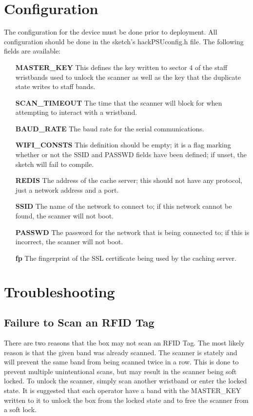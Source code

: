 \documentclass{article}
\begin{document}
\section{Configuration}
The configuration for the device must be done prior to deployment.  All configuration should be done in the sketch's hackPSUconfig.h file.  The following fields are available:
\begin{itemize}
	\item[\textbf{MASTER\_KEY}] This defines the key written to sector 4 of the staff wristbands used to unlock the scanner as well as the key that the duplicate state writes to staff bands.
	\item[\textbf{SCAN\_TIMEOUT}] The time that the scanner will block for when attempting to interact with a wristband.  
	\item[\textbf{BAUD\_RATE}] The baud rate for the serial communications.  
	\item[\textbf{WIFI\_CONSTS}] This definition should be empty; it is a flag marking whether or not the SSID and PASSWD fields have been defined; if unset, the sketch will fail to compile. 
	\item[\textbf{REDIS}] The address of the cache server; this should not have any protocol, just a network address and a port.
	\item[\textbf{SSID}] The name of the network to connect to; if this network cannot be found, the scanner will not boot.
	\item[\textbf{PASSWD}] The password for the network that is being connected to; if this is incorrect, the scanner will not boot.
	\item[\textbf{fp}] The fingerprint of the SSL certificate being used by the caching server.
\end{itemize}

\section{Troubleshooting}

\subsection{Failure to Scan an RFID Tag}
There are two reasons that the box may not scan an RFID Tag.  The most likely reason is that the given band was already scanned.  The scanner is stately and will prevent the same band from being scanned twice in a row.  This is done to prevent multiple unintentional scans, but may result in the scanner being soft locked.  To unlock the scanner, simply scan another wristband or enter the locked state.  It is suggested that each operator have a band with the MASTER\_KEY written to it to unlock the box from the locked state and to free the scanner from a soft lock.  
\end{document}
